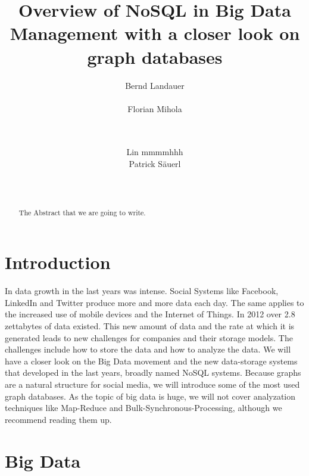 \documentclass{acm_proc_article-sp}
\begin{document}
\title{Overview of NoSQL in Big Data Management with a closer look on graph databases }

\author{
\alignauthor
Bernd Landauer\\
       \\
\alignauthor 
Florian Mihola\\
	\\
	\\
\and
\alignauthor Lin mmmmhhh
       \\
\alignauthor Patrick S{\"a}uerl\\
       \\
       \\
}


\maketitle
\begin{abstract}
The Abstract that we are going to write.
\end{abstract}

\section{Introduction}

In data growth in the last years was intense. Social Systems like Facebook, LinkedIn and Twitter produce more and more data each day. The same applies to the increased use of mobile devices and the Internet of Things. In 2012 over 2.8 zettabytes of data existed.
This new amount of data and the rate at which it is generated leads to new challenges for companies and their storage models. The challenges include how to store the data and how to analyze the data. We will have a closer look on the Big Data movement and the new data-storage systems that developed in the last years, broadly named NoSQL systems. Because graphs are a natural structure for social media, we will introduce some of the most used graph databases. As the topic of big data is huge, we will not cover analyzation techniques like Map-Reduce and Bulk-Synchronous-Processing, although we recommend reading them up.

\section{Big Data}
\end{document}
